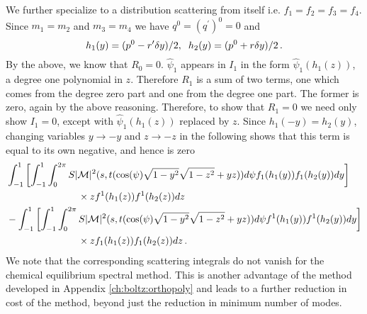 We further specialize to a distribution scattering from itself i.e. $f_1=f_2=f_3=f_4$.  Since $m_1=m_2$ and $m_3=m_4$ we have $q^0=(q^{\prime})^0=0$ and
\begin{equation}
h_1(y)=(p^0-r^{\prime}\delta y)/2,\hspace{2mm} h_2(y)=(p^0+r\delta y)/2\,.
\end{equation}
 By the above, we know that $R_0=0$.  $\hat\psi_1$ appears in $I_1$ in the form $\hat\psi_1(h_1(z))$, a degree one polynomial in $z$.  Therefore $R_1$ is a sum of two terms, one which comes from the degree zero part and one from the degree one part.  The former is zero, again by the above reasoning.  Therefore, to show that $R_1=0$ we need only show $I_1=0$, except with $\hat\psi_1(h_1(z))$ replaced by  $z$.  Since $h_1(-y)=h_2(y)$, changing variables  $y\rightarrow -y$ and $z\rightarrow -z$ in the following shows that this term is equal to its own negative, and hence is zero
\begin{align}
&\int_{-1}^1 \left[\int_{-1}^1\int_0^{2\pi}S|\mathcal{M}|^2 (s,t(\cos(\psi)\sqrt{1-y^2}\sqrt{1-z^2}+yz))d\psi f_1(h_1(y))f_1(h_2(y)) dy\right] \notag\\
&\hspace{26mm}\times  zf^1(h_1(z))f^1(h_2(z))dz\\
&-\int_{-1}^1 \left[\int_{-1}^1\int_0^{2\pi}S|\mathcal{M}|^2 (s,t(\cos(\psi)\sqrt{1-y^2}\sqrt{1-z^2}+yz))d\psi f^1(h_1(y))f^1(h_2(y)) dy\right] \notag\\
&\hspace{26mm}\times zf_{1}(h_1(z))f_1(h_2(z))dz\,.\notag
\end{align}
We note that the corresponding scattering integrals do not vanish for the chemical equilibrium spectral method.  This is another advantage of the method developed in Appendix \ref{ch:boltz:orthopoly} and leads to a further reduction in cost of the method, beyond just the reduction in minimum number of modes.


